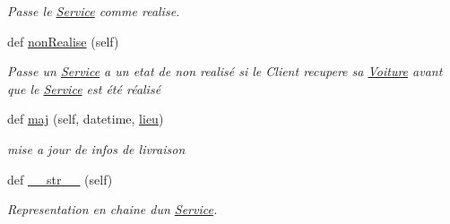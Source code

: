 \begin{DoxyCompactItemize}
\begin{DoxyCompactList}\small\item\em Passe le \hyperlink{classsrc_1_1m_1_1_service_1_1_service}{Service} comme realise. \end{DoxyCompactList}\item 
\hypertarget{classsrc_1_1m_1_1_service_1_1_service_a3ef82008f9da39553e41b8f872e6a435}{}def \hyperlink{classsrc_1_1m_1_1_service_1_1_service_a3ef82008f9da39553e41b8f872e6a435}{non\+Realise} (self)\label{classsrc_1_1m_1_1_service_1_1_service_a3ef82008f9da39553e41b8f872e6a435}

\begin{DoxyCompactList}\small\item\em Passe un \hyperlink{classsrc_1_1m_1_1_service_1_1_service}{Service} a un etat de non realisé si le Client recupere sa \hyperlink{namespacesrc_1_1m_1_1_voiture}{Voiture} avant que le \hyperlink{classsrc_1_1m_1_1_service_1_1_service}{Service} est été réalisé \end{DoxyCompactList}\item 
\hypertarget{classsrc_1_1m_1_1_service_1_1_service_a22d3e42288e335d8c9a8161b6933a488}{}def \hyperlink{classsrc_1_1m_1_1_service_1_1_service_a22d3e42288e335d8c9a8161b6933a488}{maj} (self, datetime, \hyperlink{classsrc_1_1m_1_1_service_1_1_service_ae641d10a8e3fca7c94a989853e08f105}{lieu})\label{classsrc_1_1m_1_1_service_1_1_service_a22d3e42288e335d8c9a8161b6933a488}

\begin{DoxyCompactList}\small\item\em mise a jour de infos de livraison \end{DoxyCompactList}\item 
\hypertarget{classsrc_1_1m_1_1_service_1_1_service_af4fdb27e2d613606bef6fa5fc9eda374}{}def \hyperlink{classsrc_1_1m_1_1_service_1_1_service_af4fdb27e2d613606bef6fa5fc9eda374}{\+\_\+\+\_\+str\+\_\+\+\_\+} (self)\label{classsrc_1_1m_1_1_service_1_1_service_af4fdb27e2d613606bef6fa5fc9eda374}

\begin{DoxyCompactList}\small\item\em Representation en chaine d\textquotesingle{}un \hyperlink{classsrc_1_1m_1_1_service_1_1_service}{Service}. \end{DoxyCompactList}\end{DoxyCompactItemize}
